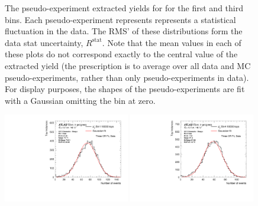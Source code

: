 \begin{figure}[t]
  \caption{The pseudo-experiment extracted yields for \mjj for the first and third bins. Each pseudo-experiment represents represents a statistical fluctuation in the data. The RMS' of these distributions form the data stat uncertainty, $R^{\text{stat}}$. Note that the mean values in each of these plots do not correspond exactly to the central value of the extracted yield (the prescription is to average over all data and MC pseudo-experiments, rather than only pseudo-experiments in data). For display purposes, the shapes of the pseudo-experiments are fit with a Gaussian omitting the bin at zero.}\label{fig:stats_data_toys_1}
\end{figure}

\begin{figure}[t]
  \centering
  \includegraphics[width=0.49\textwidth]{plots/diffx/statunc/data/Gaussians/sys_bin_errors_lep_pt_gaus_bin1_Data_Statistics.pdf}
  \includegraphics[width=0.49\textwidth]{plots/diffx/statunc/data/Gaussians/sys_bin_errors_lep_pt_gaus_bin4_Data_Statistics.pdf}

\end{figure}
